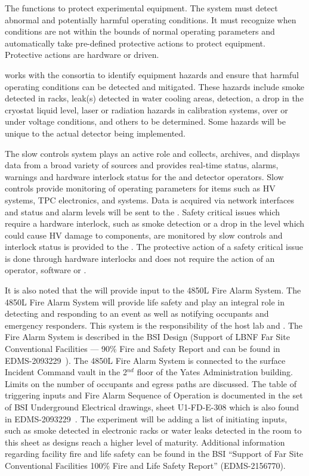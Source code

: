 The  functions to protect experimental equipment.  The
system must detect abnormal and potentially harmful operating
conditions.  It must recognize when conditions are not within the
bounds of normal operating parameters and automatically take
pre-defined protective actions to protect equipment. Protective
actions are hardware or  driven.

  works with the consortia to identify equipment
hazards and ensure that harmful operating conditions can be detected
and mitigated.  These hazards include smoke detected in racks, leak(s)
detected in water cooling areas,  detection, a drop in the
cryostat  liquid level, laser or radiation hazards in
calibration systems, over or under voltage conditions, and others to
be determined.  Some hazards will be unique to the actual detector
being implemented.

The slow controls system plays an active role and collects, archives,
and displays data from a broad variety of sources and provides
real-time status, alarms, warnings and hardware interlock status for
the  and detector operators. Slow controls provide monitoring
of operating parameters for items such as HV systems, TPC electronics,
and  systems. Data is acquired via network interfaces and status and
alarm levels will be sent to the .  Safety critical issues which
require a hardware interlock, such as smoke detection or a drop in the
 level which could cause HV damage to components, are monitored by
slow controls and interlock status is provided to the .  The
protective action of a safety critical issue is done through hardware
interlocks and does not require the action of an operator, software or
.

It is also noted that the  will provide input to the 4850L
Fire Alarm System.  The 4850L Fire Alarm System will provide life
safety and play an integral role in detecting and responding to an
event as well as notifying occupants and emergency responders.  This
system is the responsibility of the host lab and .  The
Fire Alarm System is described in the BSI Design (Support of LBNF Far
Site Conventional Facilities --- 90\% Fire and Safety Report and can
be found in EDMS-2093229~\cite{bib:cernedms2093229}). The 4850L Fire
Alarm System is connected to the surface Incident Command vault in the
2$^{nd}$ floor of the Yates Administration building. Limits on the
number of occupants and egress paths are discussed. The table of
triggering inputs and Fire Alarm Sequence of Operation is documented
in the set of BSI Underground Electrical drawings, sheet U1-FD-E-308
which is also found in EDMS-2093229~\cite{bib:cernedms2093229}. The
experiment will be adding a list of initiating inputs, such as smoke
detected in electronic racks or water leaks detected in the
 room to this sheet as designs reach a higher level of
maturity.  Additional information regarding facility fire and life
safety can be found in the BSI ``Support of  Far Site
Conventional Facilities 100\% Fire and Life Safety Report''
(EDMS-2156770).

